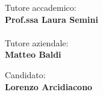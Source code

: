 \begin{titlepage}
\begin{minipage}[t]{0.47\textwidth}
	{\large{Tutore accademico:}{\normalsize\vspace{3mm}
	\bf\\ \large{Prof.ssa Laura Semini}}}\\
    {\\\large{Tutore aziendale:}{\normalsize\vspace{3mm}
	\bf\\ \large{Matteo Baldi}}}
\end{minipage}
\hfill
\begin{minipage}[t]{0.47\textwidth}\raggedleft
	{\large{Candidato:}{\normalsize\vspace{3mm} \bf\\ \large{Lorenzo Arcidiacono}}}
\end{minipage}

\vspace{10mm}
\hrulefill
\\

\end{titlepage}